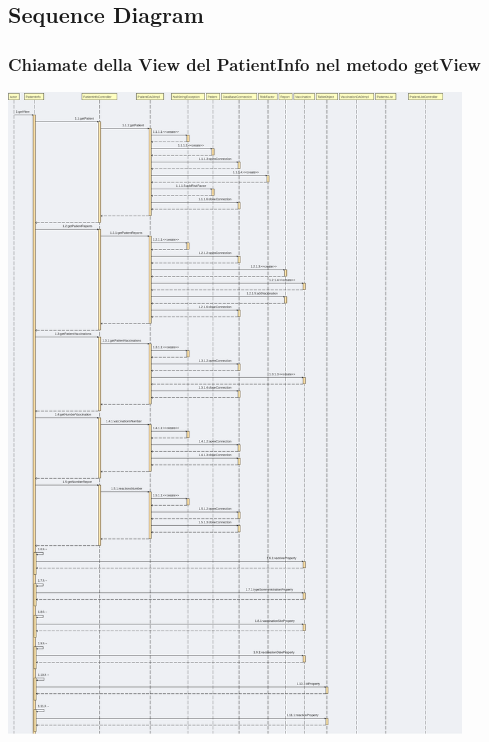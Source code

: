 \documentclass[11pt]{article}
\begin{document}
    \newpage
        \subsection{Sequence Diagram}
            \subsubsection*{Chiamate della View del PatientInfo nel metodo getView}
            \begin{center}
                \includegraphics[width=0.90\textwidth]{pictures/prova_001.png}
            \end{center}
    \newpage
\end{document}
